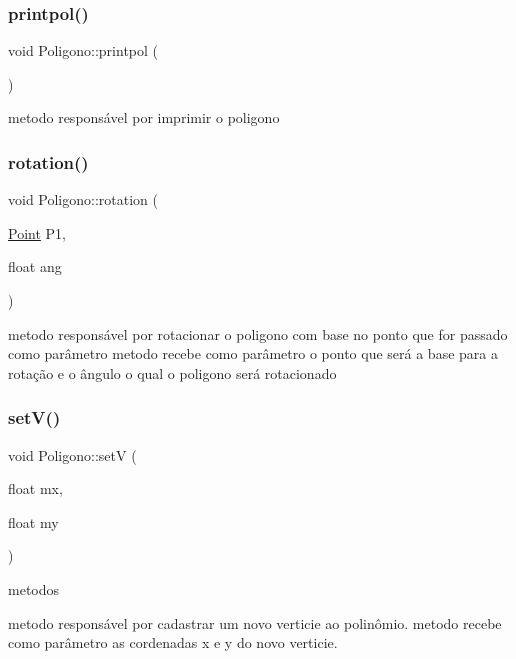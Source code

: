 \subsubsection{\texorpdfstring{printpol()}{printpol()}}
{\footnotesize\ttfamily void Poligono\+::printpol (\begin{DoxyParamCaption}{ }\end{DoxyParamCaption})}

metodo responsável por imprimir o poligono \mbox{\label{classPoligono_a8891a75b7f11bd764a99f296145e26dd}} 
\subsubsection{\texorpdfstring{rotation()}{rotation()}}
{\footnotesize\ttfamily void Poligono\+::rotation (\begin{DoxyParamCaption}\item[{\hyperlink{classPoint}{Point}}]{P1,  }\item[{float}]{ang }\end{DoxyParamCaption})}

metodo responsável por rotacionar o poligono com base no ponto que for passado como parâmetro metodo recebe como parâmetro o ponto que será a base para a rotação e o ângulo o qual o poligono será rotacionado \mbox{\label{classPoligono_a15dd684ea903a4eb5ba8671d57facb82}} 
\subsubsection{\texorpdfstring{set\+V()}{setV()}}
{\footnotesize\ttfamily void Poligono\+::setV (\begin{DoxyParamCaption}\item[{float}]{mx,  }\item[{float}]{my }\end{DoxyParamCaption})}



metodos 

metodo responsável por cadastrar um novo verticie ao polinômio. metodo recebe como parâmetro as cordenadas x e y do novo verticie. \mbox{\label{classPoligono_adbf605dfd0419b7301c9be0ec1dbe41b}} 
